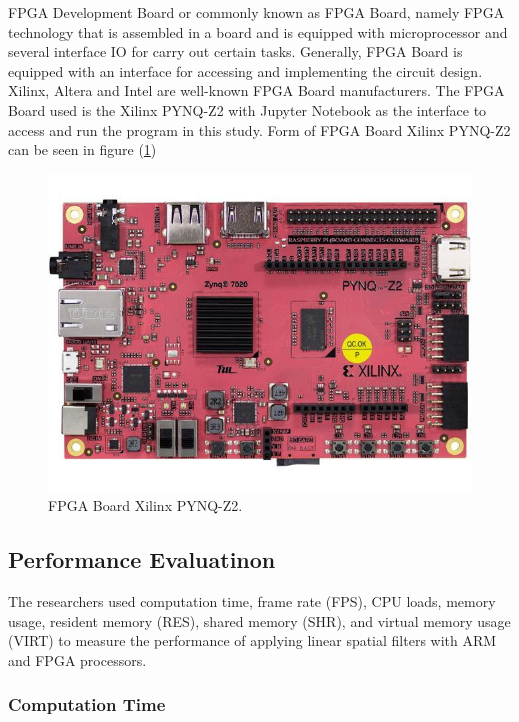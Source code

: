 FPGA Development Board or commonly known as FPGA Board, namely FPGA technology that is assembled in a board and is equipped with microprocessor and several interface IO for carry out certain tasks. Generally, FPGA Board is equipped with an interface for accessing and implementing the circuit design. Xilinx, Altera and Intel are well-known FPGA Board manufacturers. The FPGA Board used is the Xilinx PYNQ-Z2 with Jupyter Notebook as the interface to access and run the program in this study. Form of FPGA Board Xilinx PYNQ-Z2 can be seen in figure (\ref{fig:pynq-z2})

\begin{figure}[ht]
    \includegraphics[width=0.8\linewidth, center]{images/pynq-z2.jpeg}
    \caption{FPGA Board Xilinx PYNQ-Z2.}
    \label{fig:pynq-z2}
\end{figure}


\subsection{Performance Evaluatinon}

The researchers used computation time, frame rate (FPS), CPU loads, memory usage, resident memory (RES), shared memory (SHR), and virtual memory usage (VIRT) to measure the performance of applying linear spatial filters with ARM and FPGA processors.

\subsubsection{Computation Time}

